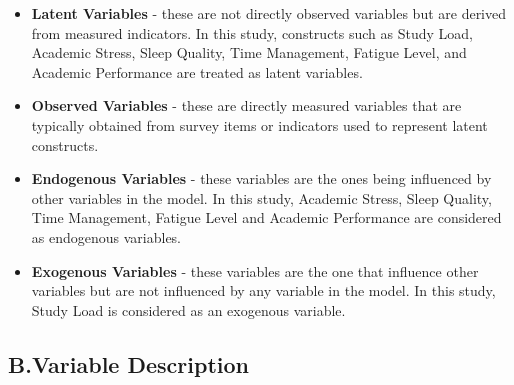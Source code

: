 \documentclass [12pt]{article}
\begin{document}
\begin{itemize}
    \item \textbf{Latent Variables} - these are not directly observed variables but are derived from measured indicators. In this study, constructs such as Study Load, Academic Stress, Sleep Quality, Time Management, Fatigue Level, and Academic Performance are treated as latent variables. 

    \item \textbf{Observed Variables} - these are directly measured variables that are typically obtained from survey items or indicators used to represent latent constructs. 

    \item \textbf{Endogenous Variables} - these variables are the ones being influenced by other variables in the model. In this study, Academic Stress, Sleep Quality, Time Management, Fatigue Level and Academic Performance are considered as endogenous variables. 

    \item \textbf{Exogenous Variables} - these variables are the one that influence other variables but are not influenced by any variable in the model. In this study, Study Load is considered as an exogenous variable. 
\end{itemize}

\subsection*{B.Variable Description}
\end{document}
